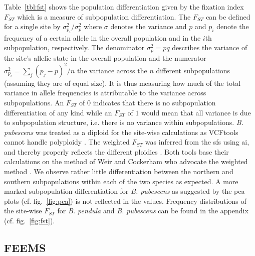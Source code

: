 \documentclass[hidelinks,11pt]{article}
\newcommand{\dadi}{\textdelta a\textdelta i}
\newcommand{\pendula}{\textit{B. pendula}}
\newcommand{\pubescens}{\textit{B. pubescens}}
\begin{document}
{    Table~\ref{tbl:fst} shows the population differentiation given by the fixation index $F_{ST}$ which is a measure of subpopulation differentiation. The $F_{ST}$ can be defined for a single site by $\sigma^2_{p_i}/\sigma^2_p$ where $\sigma$ denotes the variance and $p$ and $p_i$ denote the frequency of a certain allele in the overall population and in the $i$th subpopulation, respectively. The denominator $\sigma^2_p = pq$ describes the variance of the site's allelic state in the overall population and the numerator $\sigma^2_{p_i} = \sum_j (p_j - p)^2 / n$ the variance across the $n$ different subpopulations (assuming they are of equal size)\cite{gillespie}. It is thus measuring how much of the total variance in allele frequencies is attributable to the variance across subpopulations. An $F_{ST}$ of $0$ indicates that there is no subpopulation differentiation of any kind while an $F_{ST}$ of $1$ would mean that all variance is due to subpopulation structure, i.e. there is no variance within subpopulations. \pubescens{} was treated as a diploid for the site-wise calculations as VCFtools cannot handle polyploidy \cite{vcftools}. The weighted $F_{ST}$ was inferred from the \acrshort{sfs} using \dadi{}, and thereby properly reflects the different ploidies \cite{dadi}. Both tools base their calculations on the method of Weir and Cockerham who advocate the weighted method \cite{weir-cockerham}. We observe rather little differentiation between the northern and southern subpopulations within each of the two species as expected. A more marked subpopulation differentiation for \pubescens{} as suggested by the \acrshort{pca} plots (cf. fig.~\ref{fig:pca}) is not reflected in the values. Frequency distributions of the site-wise $F_{ST}$ for \pendula{} and \pubescens{} can be found in the appendix (cf. fig.~\ref{fig:fst}).

    \subsection{FEEMS}
    \label{sec:feems}

}
\end{document}
